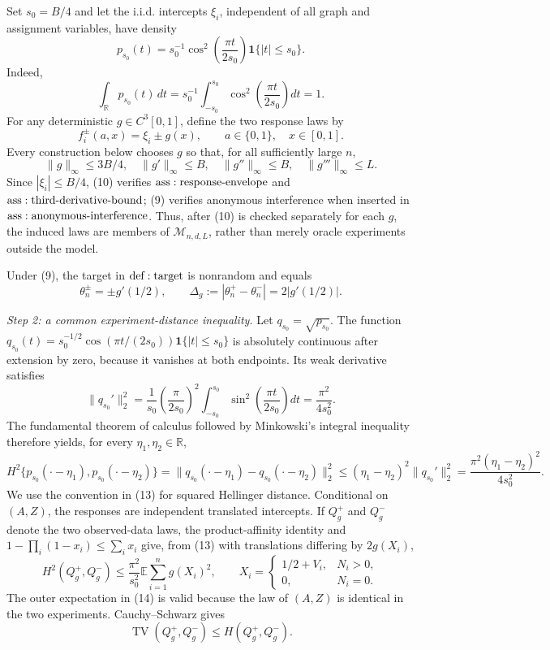 Set \(s_0=B/4\) and let the i.i.d. intercepts \(\xi_i\), independent of all graph and assignment variables, have density
\[
p_{s_0}(t)=s_0^{-1}\cos^2\!\left(\frac{\pi t}{2s_0}\right)\mathbf 1\{|t|\leq s_0\}.
\tag{8}
\]
Indeed,
\[
 \int_{\mathbb R}p_{s_0}(t)\,dt
 =s_0^{-1}\int_{-s_0}^{s_0}\cos^2\!\left(\frac{\pi t}{2s_0}\right)dt=1.
\]
For any deterministic \(g\in C^3[0,1]\), define the two response laws by
\[
 f_i^\pm(a,x)=\xi_i\pm g(x),
 \qquad a\in\{0,1\},\quad x\in[0,1].
\tag{9}
\]
Every construction below chooses \(g\) so that, for all sufficiently large \(n\),
\[
 \|g\|_\infty\leq3B/4,
 \quad \|g'\|_\infty\leq B,
 \quad \|g''\|_\infty\leq B,
 \quad \|g'''\|_\infty\leq L.
\tag{10}
\]
Since \(|\xi_i|\leq B/4\), (10) verifies \({\rm ass:response\text{-}envelope}\) and \({\rm ass:third\text{-}derivative\text{-}bound}\); (9) verifies anonymous interference when inserted in \({\rm ass:anonymous\text{-}interference}\).  Thus, after (10) is checked separately for each \(g\), the induced laws are members of \(\mathcal M_{n,d,L}\), rather than merely oracle experiments outside the model.

Under (9), the target in \({\rm def:target}\) is nonrandom and equals
\[
 \theta_n^\pm=\pm g'(1/2),
 \qquad
 \Delta_g:=|\theta_n^+-\theta_n^-|=2|g'(1/2)|.
\tag{11}
\]

\textit{Step 2: a common experiment-distance inequality.}
Let \(q_{s_0}=\sqrt{p_{s_0}}\).  The function \(q_{s_0}(t)=s_0^{-1/2}\cos(\pi t/(2s_0))\mathbf 1\{|t|\leq s_0\}\) is absolutely continuous after extension by zero, because it vanishes at both endpoints.  Its weak derivative satisfies
\[
 \|q_{s_0}'\|_2^2
 =\frac1{s_0}\left(\frac{\pi}{2s_0}\right)^2
 \int_{-s_0}^{s_0}\sin^2\!\left(\frac{\pi t}{2s_0}\right)dt
 =\frac{\pi^2}{4s_0^2}.
\tag{12}
\]
The fundamental theorem of calculus followed by Minkowski's integral inequality therefore yields, for every \(\eta_1,\eta_2\in\mathbb R\),
\[
 H^2\{p_{s_0}(\mathord\cdot-\eta_1),p_{s_0}(\mathord\cdot-\eta_2)\}
 =\|q_{s_0}(\mathord\cdot-\eta_1)-q_{s_0}(\mathord\cdot-\eta_2)\|_2^2
 \leq(\eta_1-\eta_2)^2\|q_{s_0}'\|_2^2
 =\frac{\pi^2(\eta_1-\eta_2)^2}{4s_0^2}.
\tag{13}
\]
We use the convention in (13) for squared Hellinger distance.  Conditional on \((A,Z)\), the responses are independent translated intercepts.  If \(Q_g^+\) and \(Q_g^-\) denote the two observed-data laws, the product-affinity identity and \(1-\prod_i(1-x_i)\leq\sum_i x_i\) give, from (13) with translations differing by \(2g(X_i)\),
\[
 H^2(Q_g^+,Q_g^-)
 \leq\frac{\pi^2}{s_0^2}\mathbb E\sum_{i=1}^ng(X_i)^2,
 \qquad
 X_i=\begin{cases}1/2+V_i,&N_i>0,\\0,&N_i=0.\end{cases}
\tag{14}
\]
The outer expectation in (14) is valid because the law of \((A,Z)\) is identical in the two experiments.  Cauchy--Schwarz gives
\[
 \operatorname{TV}(Q_g^+,Q_g^-)
 \leq H(Q_g^+,Q_g^-).
\tag{15}
\]

